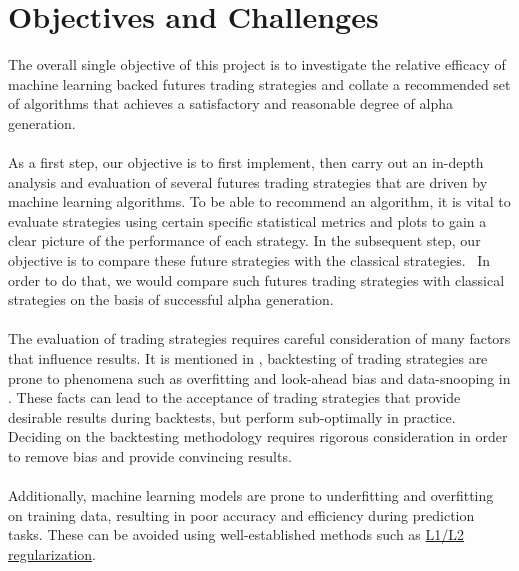 \section{Objectives and Challenges}
The overall single objective of this project is to investigate the relative efficacy of machine learning backed futures trading strategies and collate a recommended set of algorithms that achieves a satisfactory and reasonable degree of alpha generation. \\ \\
As a first step, our objective is to first implement, then carry out an in-depth analysis and evaluation of several futures trading strategies that are driven by machine learning algorithms. To be able to recommend an algorithm, it is vital to evaluate strategies using certain specific statistical metrics and plots to gain a clear picture of the performance of each strategy. In the subsequent step, our objective is to compare these future strategies with the classical strategies.  In order to do that, we would compare such futures trading strategies with classical strategies on the basis of successful alpha generation. \\ \\
The evaluation of trading strategies requires careful consideration of many factors that influence results. It is mentioned in \cite{bailey2014deflated}, backtesting of trading strategies are prone to phenomena such as overfitting and look-ahead bias and data-snooping in \cite{daniel2009look}. These facts can lead to the acceptance of trading strategies that provide desirable results during backtests, but perform sub-optimally in practice. Deciding on the backtesting methodology requires rigorous consideration in order to remove bias and provide convincing results. \\ \\
Additionally, machine learning models are prone to underfitting and overfitting on training data, resulting in poor accuracy and efficiency during prediction tasks. These can be avoided using well-established methods such as \hyperref[l1l2]{L1/L2 regularization}.

